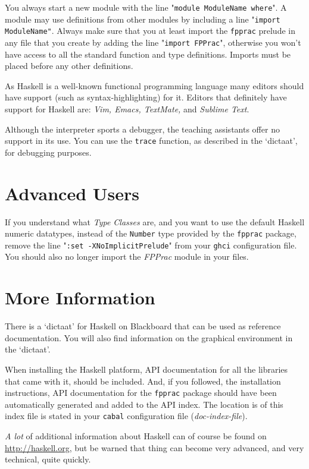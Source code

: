 \documentclass[]{article}
\begin{document}
You always start a new module with the line "\texttt{module ModuleName where}".
A module may use definitions from other modules by including a line "\texttt{import ModuleName"}.
Always make sure that you at least import the \texttt{fpprac} prelude in any file that you create by adding the line "\texttt{import FPPrac}", otherwise you won't have access to all the standard function and type definitions. 
Imports must be placed before any other definitions.

As Haskell is a well-known functional programming language many editors should have support (such as syntax-highlighting) for it.
Editors that definitely have support for Haskell are: \emph{Vim, Emacs, TextMate,} and \emph{Sublime Text}. 

Although the interpreter sports a debugger, the teaching assistants offer no support in its use.
You can use the \texttt{trace} function, as described in the `dictaat', for debugging purposes.

\section{Advanced Users}
If you understand what \emph{Type Classes} are, and you want to use the default Haskell numeric datatypes, instead of the \texttt{Number} type provided by the \texttt{fpprac} package, remove the line "\texttt{:set -XNoImplicitPrelude}" from your \texttt{ghci} configuration file.
You should also no longer import the \emph{FPPrac} module in your files. 

\section{More Information}
There is a `dictaat' for Haskell on Blackboard that can be used as reference documentation.
You will also find information on the graphical environment in the `dictaat'.

When installing the Haskell platform, API documentation for all the libraries that came with it, should be included.
And, if you followed, the installation instructions, API documentation for the \texttt{fpprac} package should have been automatically generated and added to the API index.
The location is of this index file is stated in your \texttt{cabal} configuration file (\emph{doc-index-file}). 

\emph{A lot} of additional information about Haskell can of course be found on \url{http://haskell.org}, but be warned that thing can become very advanced, and very technical, quite quickly.
\end{document}
